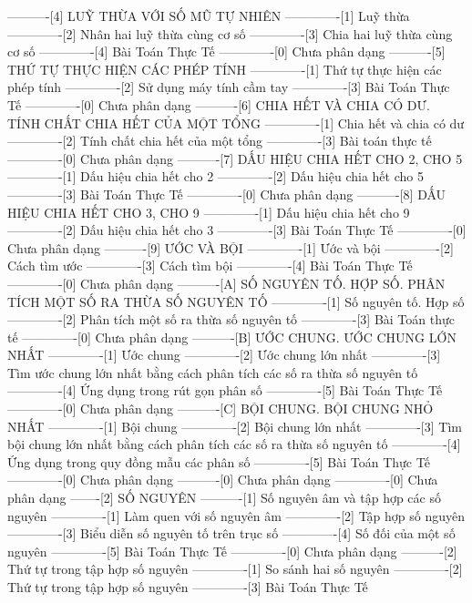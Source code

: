 ----------[4] LUỸ THỪA VỚI SỐ MŨ TỰ NHIÊN
-------------[1] Luỹ thừa
-------------[2] Nhân hai luỹ thừa cùng cơ số
-------------[3] Chia hai luỹ thừa cùng cơ số
-------------[4] Bài Toán Thực Tế
-------------[0] Chưa phân dạng
----------[5] THỨ TỰ THỰC HIỆN CÁC PHÉP TÍNH
-------------[1] Thứ tự thực hiện các phép tính
-------------[2] Sử dụng máy tính cầm tay
-------------[3] Bài Toán Thực Tế
-------------[0] Chưa phân dạng
----------[6] CHIA HẾT VÀ CHIA CÓ DƯ. TÍNH CHẤT CHIA HẾT CỦA MỘT TỔNG
-------------[1] Chia hết và chia có dư
-------------[2] Tính chất chia hết của một tổng
-------------[3] Bài toán thực tế
-------------[0] Chưa phân dạng
----------[7] DẤU HIỆU CHIA HẾT CHO 2, CHO 5
-------------[1] Dấu hiệu chia hết cho 2
-------------[2] Dấu hiệu chia hết cho 5
-------------[3] Bài Toán Thực Tế
-------------[0] Chưa phân dạng
----------[8] DẤU HIỆU CHIA HẾT CHO 3, CHO 9
-------------[1] Dấu hiệu chia hết cho 9
-------------[2] Dấu hiệu chia hết cho 3
-------------[3] Bài Toán Thực Tế
-------------[0] Chưa phân dạng
----------[9] ƯỚC VÀ BỘI
-------------[1] Ước và bội
-------------[2] Cách tìm ước
-------------[3] Cách tìm bội
-------------[4] Bài Toán Thực Tế
-------------[0] Chưa phân dạng
----------[A] SỐ NGUYÊN TỐ. HỢP SỐ. PHÂN TÍCH MỘT SỐ RA THỪA SỐ NGUYÊN TỐ
-------------[1] Số nguyên tố. Hợp số
-------------[2] Phân tích một số ra thừa số nguyên tố
-------------[3] Bài Toán thực tế
-------------[0] Chưa phân dạng
----------[B] ƯỚC CHUNG. ƯỚC CHUNG LỚN NHẤT
-------------[1] Ước chung
-------------[2] Ước chung lớn nhất
-------------[3] Tìm ước chung lớn nhất bằng cách phân tích các số ra thừa số nguyên tố
-------------[4] Ứng dụng trong rút gọn phân số
-------------[5] Bài Toán Thực Tế
-------------[0] Chưa phân dạng
----------[C] BỘI CHUNG. BỘI CHUNG NHỎ NHẤT
-------------[1] Bội chung
-------------[2] Bội chung lớn nhất
-------------[3] Tìm bội chung lớn nhất bằng cách phân tích các số ra thừa số nguyên tố
-------------[4] Ứng dụng trong quy đồng mẫu các phân số
-------------[5] Bài Toán Thực Tế
-------------[0] Chưa phân dạng
----------[0] Chưa phân dạng
-------------[0] Chưa phân dạng
-------[2] SỐ NGUYÊN
----------[1] Số nguyên âm và tập hợp các số nguyên
-------------[1] Làm quen với số nguyên âm
-------------[2] Tập hợp số nguyên
-------------[3] Biểu diễn số nguyên tố trên trục số
-------------[4] Số đối của một số nguyên
-------------[5] Bài Toán Thực Tế
-------------[0] Chưa phân dạng
----------[2] Thứ tự trong tập hợp số nguyên
-------------[1] So sánh hai số nguyên
-------------[2] Thứ tự trong tập hợp số nguyên
-------------[3] Bài Toán Thực Tế
